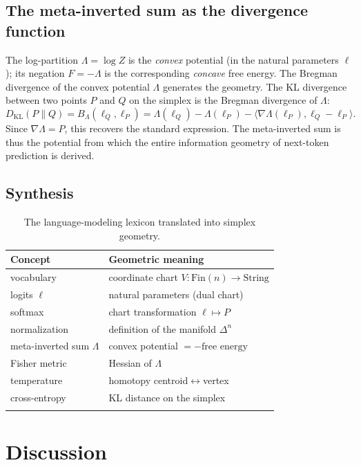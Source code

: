 \documentclass[11pt]{article}
\newcommand{\simplex}[1]{\Delta^{#1}}
\begin{document}
\subsection{The meta-inverted sum as the divergence function}
\label{sec:infogeo-div}

The log-partition $\Lambda=\log Z$ is the \emph{convex} potential (in the
natural parameters $\ell$); its negation $F=-\Lambda$ is the corresponding
\emph{concave} free energy.  The Bregman divergence of the convex potential
$\Lambda$ generates the geometry. The KL divergence between two points $P$ and
$Q$ on the simplex is the Bregman divergence of $\Lambda$:
\[
D_{\mathrm{KL}}(P\|Q) = B_\Lambda(\ell_Q, \ell_P)
= \Lambda(\ell_Q) - \Lambda(\ell_P) - \langle \nabla\Lambda(\ell_P), \ell_Q-\ell_P\rangle.
\]
Since $\nabla\Lambda = P$, this recovers the standard expression. The
meta-inverted sum is thus the potential from which the entire information
geometry of next-token prediction is derived.

\subsection{Synthesis}
\label{sec:infogeo-synth}

\begin{longtable}{@{}ll@{}}
\toprule
Concept & Geometric meaning \\
\midrule
vocabulary & coordinate chart $V:\mathrm{Fin}(n)\to\mathrm{String}$ \\
logits $\ell$ & natural parameters (dual chart) \\
softmax & chart transformation $\ell\mapsto P$ \\
normalization & definition of the manifold $\simplex{n}$ \\
meta-inverted sum $\Lambda$ & convex potential $=-\text{free energy}$ \\
Fisher metric & Hessian of $\Lambda$ \\
temperature & homotopy centroid$\leftrightarrow$vertex \\
cross-entropy & KL distance on the simplex \\
\bottomrule
\caption{The language-modeling lexicon translated into simplex geometry.}
\label{tab:lexicon}
\end{longtable}

\section{Discussion}
\label{sec:discussion}
\end{document}
